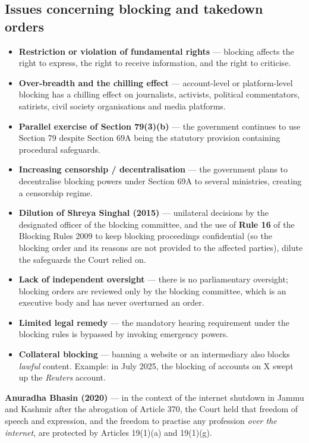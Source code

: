 \subsection{Issues concerning blocking and takedown orders}

\begin{itemize}
  \item \textbf{Restriction or violation of fundamental rights} — blocking affects the
        right to express, the right to receive information, and the right to criticise.
  \item \textbf{Over-breadth and the chilling effect} — account-level or platform-level
        blocking has a chilling effect on journalists, activists, political commentators,
        satirists, civil society organisations and media platforms.
  \item \textbf{Parallel exercise of Section 79(3)(b)} — the government continues to use
        Section 79 despite Section 69A being the statutory provision containing procedural
        safeguards.
  \item \textbf{Increasing censorship / decentralisation} — the government plans to
        decentralise blocking powers under Section 69A to several ministries, creating a
        censorship regime.
  \item \textbf{Dilution of Shreya Singhal (2015)} — unilateral decisions by the
        designated officer of the blocking committee, and the use of \textbf{Rule 16} of
        the Blocking Rules 2009 to keep blocking proceedings confidential (so the blocking
        order and its reasons are not provided to the affected parties), dilute the
        safeguards the Court relied on.
  \item \textbf{Lack of independent oversight} — there is no parliamentary oversight;
        blocking orders are reviewed only by the blocking committee, which is an executive
        body and has never overturned an order.
  \item \textbf{Limited legal remedy} — the mandatory hearing requirement under the
        blocking rules is bypassed by invoking emergency powers.
  \item \textbf{Collateral blocking} — banning a website or an intermediary also blocks
        \emph{lawful} content. Example: in July 2025, the blocking of accounts on X
        swept up the \emph{Reuters} account.
\end{itemize}

\begin{ExampleBox}
\textbf{Anuradha Bhasin (2020)} — in the context of the internet shutdown in Jammu and
Kashmir after the abrogation of Article 370, the Court held that freedom of speech and
expression, and the freedom to practise any profession \emph{over the internet}, are
protected by Articles 19(1)(a) and 19(1)(g).
\end{ExampleBox}

